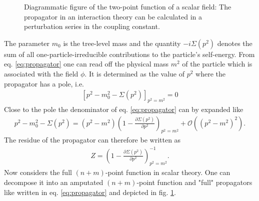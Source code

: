 \begin{figure}[!htbp]
\begin{center}
\caption{Diagrammatic figure of the two-point function of a scalar field: The propagator in an interaction theory can be calculated in a perturbation series in the coupling constant.}\label{fig:fullpropagator}
\end{center}
\end{figure}
The parameter $m_0$ is the tree-level mass and the quantity $-i \Sigma(p^2)$ denotes the sum of all one-particle-irreducible contributions to the particle's self-energy. From eq. \eqref{eq:propagator} one can read off the physical mass $m^2$ of the particle which is associated with the field $\phi$. It is determined as the value of $p^2$ where the propagator has a pole, i.e. 
\begin{align}
\left[ p^2 - m_0^2 - \Sigma(p^2)\right]_{p^2 = m^2} = 0
\end{align}
Close to the pole the denominator of eq. \eqref{eq:propagator} can by expanded like
\begin{align}
p^2 - m_0^2 - \Sigma(p^2) = (p^2 - m^2)\left( 1 - \frac{\partial \Sigma(p^2)}{\partial p^2} \right)_{p^2 = m^2} + \mathcal{O}((p^2 - m^2)^2).
\end{align}
The residue of the propagator can therefore be written as 
\begin{align}
Z = \left( 1 - \frac{\partial \Sigma(p^2)}{\partial p^2} \right)_{p^2 = m^2}^{-1}.
\end{align}
Now considers the full $(n+m)$-point function in scalar theory. One can decompose it into an amputated $(n+m)$-point function and "full" propagators like written in eq. \eqref{eq:propagator} and depicted in fig. \ref{fig:fullpropagator}.
